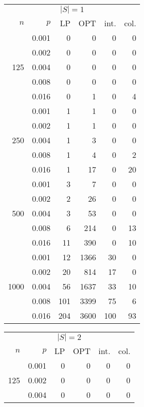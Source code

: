 \begin{table}[]
\begin{minipage}{.45\linewidth}
\begin{tabular}{rrrrrr}
\multicolumn{6}{c}{$|S|=1$} \\
$n$ & $p$ & LP  & OPT & int. & col. \\
\hline
\multirow{5}{*}{125} 
 & 0.001 & 0   &  0 & 0 & 0 \\ 
 & 0.002 & 0   &  0 & 0 & 0 \\
 & 0.004 & 0   &  0 & 0 & 0 \\
 & 0.008 & 0   &  0 & 0 & 0 \\
 & 0.016 & 0   &  1 & 0 & 4 \\
\hline                      
\multirow{5}{*}{250}        
 & 0.001 &  1  &  1 & 0 & 0 \\
 & 0.002 &  1  &  1 & 0 & 0 \\
 & 0.004 &  1  &  3 & 0 & 0 \\
 & 0.008 &  1  &  4 & 0 & 2 \\
 & 0.016 &  1  & 17 & 0 &20 \\
\hline                      
\multirow{5}{*}{500}        
 & 0.001 & 3   &  7 & 0 & 0 \\
 & 0.002 & 2   & 26 & 0 & 0 \\
 & 0.004 & 3   & 53 & 0 & 0 \\
 & 0.008 & 6   &214 & 0 &13 \\
 & 0.016 &11   &390 & 0 &10 \\
\hline                      
\multirow{5}{*}{1000}        
 & 0.001 & 12  &1366& 30& 0 \\
 & 0.002 & 20  & 814& 17& 0 \\
 & 0.004 & 56  &1637& 33&10 \\
 & 0.008 &101  &3399& 75& 6 \\
 & 0.016 &204  &3600&100&93 
\end{tabular}
\end{minipage}
\hspace{1.5cm}
\begin{minipage}{.45\linewidth}
\begin{tabular}{rrrrrr}
\multicolumn{6}{c}{$|S|=2$}  \\
$n$ & $p$ & LP  & OPT & int. & col. \\
\hline
\multirow{5}{*}{125} 
& 0.001 &  0  &  0 &  0  &  0\\
& 0.002 &  0  &  0 &  0  &  0\\
& 0.004 &  0  &  0 &  0  &  0\\ 

\end{tabular}
\end{minipage}
\end{table}
